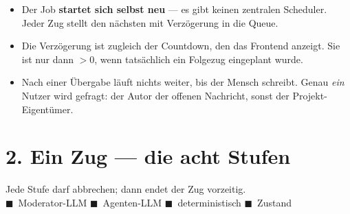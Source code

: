 \documentclass[11pt,a4paper]{article}
\begin{document}
\begin{itemize}
  \item Der Job \textbf{startet sich selbst neu} --- es gibt keinen zentralen Scheduler.
        Jeder Zug stellt den nächsten mit Verzögerung in die Queue.
  \item Die Verzögerung ist zugleich der Countdown, den das Frontend anzeigt. Sie ist
        nur dann $>0$, wenn tatsächlich ein Folgezug eingeplant wurde.
  \item Nach einer Übergabe läuft nichts weiter, bis der Mensch schreibt. Genau
        \emph{ein} Nutzer wird gefragt: der Autor der offenen Nachricht, sonst der
        Projekt-Eigentümer.
\end{itemize}

\clearpage
\section*{2. Ein Zug --- die acht Stufen}

Jede Stufe darf abbrechen; dann endet der Zug vorzeitig.\\
{\footnotesize
\textcolor{modblue}{$\blacksquare$}~Moderator-LLM \quad
\textcolor{agentgreen}{$\blacksquare$}~Agenten-LLM \quad
\textcolor{detgrey}{$\blacksquare$}~deterministisch \quad
\textcolor{statamber}{$\blacksquare$}~Zustand}
\end{document}

